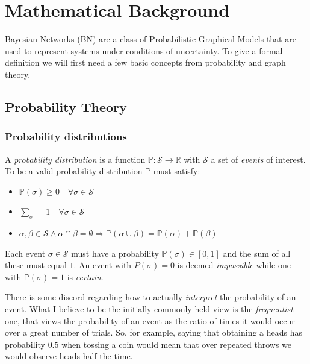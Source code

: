 
\section{Mathematical Background}
Bayesian Networks (BN) are a class of Probabilistic Graphical Models that are used to represent systems under conditions of uncertainty.
To give a formal definition we will first need a few basic concepts from probability and graph theory.

\subsection{Probability Theory}
\subsubsection{Probability distributions}
\begin{definition}
	A \textit{probability distribution} is a function $\mathbb{P}: \mathcal{S} \rightarrow \mathbb{R}$ with $\mathcal{S}$ a set of \textit{events} of interest.  
To be a valid probability distribution $\mathbb{P}$ must satisfy:
\begin{itemize}
	\item $\mathbb{P}(\sigma) \geq 0 \quad \forall \sigma \in \mathcal{S}$
	\item $\sum_{\sigma} = 1 \quad \forall \sigma \in \mathcal{S}$
	\item $\alpha, \beta \in \mathcal{S} \wedge \alpha \cap \beta=\emptyset 	\Rightarrow \mathbb{P}(\alpha \cup \beta)=\mathbb{P}(\alpha)+\mathbb{P}(\beta)$
\end{itemize}
\end{definition}
Each event $\sigma \in \mathcal{S}$ must have a probability $\mathbb{P}(\sigma) \in [0,1]$ and the sum of all these must equal $1$. 
An event with $P(\sigma) = 0$ is deemed \textit{impossible} while one with $\mathbb{P}(\sigma) = 1$ is \textit{certain}.

There is some discord regarding how to actually \textit{interpret} the probability of an event.
What I believe to be the initially commonly held view is the \textit{frequentist} one, that views the probability of an event as the ratio of times it would occur over a great number of trials.  
So, for example, saying that obtaining a heads has probability $0.5$ when tossing a coin would mean that over repeated throws we would observe heads half the time.

